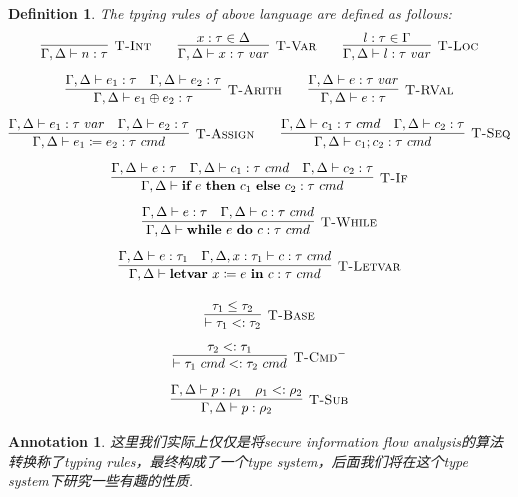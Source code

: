 \documentclass{article}
\newtheorem{definition}[theorem]{Definition}
\newtheorem{annotation}[theorem]{Annotation}
\newcommand{\termtype}[2]{\ensuremath{#1:#2}}
\newcommand{\ifelse}[3]{\ensuremath{\textbf{if}~#1~\textbf{then}~#2~\textbf{else}~#3}}
\newcommand{\newwhiledo}[2]{\ensuremath{\textbf{while}~#1~\textbf{do}~#2}}
\newcommand{\letvar}[2]{\ensuremath{\textbf{letvar}~#1~\textbf{in}~#2}}
\begin{document}
\begin{definition}
\rm The tpying rules of above language are defined as follows:
\[
	\begin{gathered}
	\infer[\textsc{T-Int}]{\Gamma, \Delta \vdash \termtype{n}{\tau}}{} \quad\quad \infer[\textsc{T-Var}]{\Gamma, \Delta \vdash \termtype{x}{\tau~var}}{\termtype{x}{\tau} \in \Delta} \quad\quad \infer[\textsc{T-Loc}]{\Gamma, \Delta \vdash \termtype{l}{\tau~var}}{\termtype{l}{\tau} \in \Gamma} \\[0.5em]
	\infer[\textsc{T-Arith}]{\Gamma, \Delta \vdash \termtype{e_1 \oplus e_2}{\tau}}{\Gamma, \Delta \vdash \termtype{e_1}{\tau} & \Gamma, \Delta \vdash \termtype{e_2}{\tau}} \quad\quad \infer[\textsc{T-RVal}]{\Gamma, \Delta \vdash \termtype{e}{\tau}}{\Gamma, \Delta \vdash \termtype{e}{\tau~var}} \\[0.5em]
	\infer[\textsc{T-Assign}]{\Gamma, \Delta \vdash \termtype{e_1 \coloneqq e_2}{\tau~cmd}}{\Gamma, \Delta \vdash \termtype{e_1}{\tau~var} & \Gamma, \Delta \vdash \termtype{e_2}{\tau}} \quad\quad \infer[\textsc{T-Seq}]{\Gamma, \Delta \vdash \termtype{c_1;c_2}{\tau~cmd}}{\Gamma, \Delta \vdash \termtype{c_1}{\tau~cmd} & \Gamma, \Delta \vdash \termtype{c_2}{\tau}} \\[0.5em]
	\infer[\textsc{T-If}]{\Gamma, \Delta \vdash \termtype{\ifelse{e}{c_1}{c_2}}{\tau~cmd}}{\Gamma, \Delta \vdash \termtype{e}{\tau} & \Gamma, \Delta \vdash \termtype{c_1}{\tau~cmd} & \Gamma, \Delta \vdash \termtype{c_2}{\tau}}  \\[0.5em]
	\infer[\textsc{T-While}]{\Gamma, \Delta \vdash \termtype{\newwhiledo{e}{c}}{\tau~cmd}}{\Gamma, \Delta \vdash \termtype{e}{\tau} & \Gamma, \Delta \vdash \termtype{c}{\tau~cmd}}  \\[0.5em]
	\infer[\textsc{T-Letvar}]{\Gamma, \Delta \vdash \termtype{\letvar{x \coloneqq e}{c}}{\tau~cmd}}{\Gamma, \Delta \vdash \termtype{e}{\tau_1} & \Gamma, \Delta, \termtype{x}{\tau_1} \vdash \termtype{c}{\tau~cmd}} \\[1em]
	\infer[\textsc{T-Base}]{\vdash \tau_1 <: \tau_2}{\tau_1 \leq \tau_2} \\[0.5em]
	\infer[\textsc{T-Cmd}^-]{\vdash \tau_1~cmd <: \tau_2~cmd}{\tau_2 <: \tau_1}\\[0.5em]
	\infer[\textsc{T-Sub}]{\Gamma, \Delta \vdash \termtype{p}{\rho_2}}{\Gamma, \Delta \vdash \termtype{p}{\rho_1} & \rho_1 <: \rho_2}
	\end{gathered}
\]
\end{definition}


\begin{annotation}
\rm 这里我们实际上仅仅是将secure information flow analysis的算法转换称了typing rules，最终构成了一个type system，后面我们将在这个type system下研究一些有趣的性质. 
\end{annotation}
\end{document}

